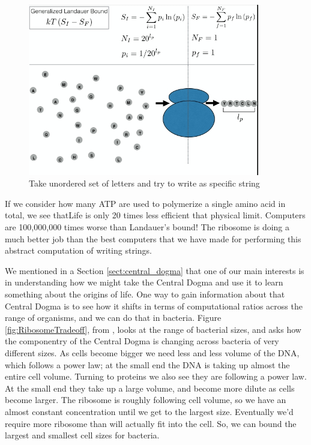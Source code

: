 \documentclass[]{article}
\begin{document}
\begin{figure}[H]
	\caption[Illustrating Landuer's Bound]{Take unordered set of letters and try to write as specific string\cite{kempes2017thermodynamic}}\label{fig:LandauerRibosome} 
	\includegraphics[width=0.9\textwidth]{LandauerRibosome}
\end{figure}

If we consider how many ATP are used to polymerize a single amino acid in total, we see thatLife is only 20 times less efficient that physical limit\cite{kempes2017thermodynamic}. Computers are 100,000,000 times worse than Landauer's bound! The ribosome is doing a much better job than the best computers that we have made for performing this abstract computation of writing strings.


We mentioned in a Section \ref{sect:central_dogma} that one of our main interests is in understanding how we might take the Central Dogma and use it to learn something about the origins of life. One way to gain information about that Central Dogma is to see how it shifts in terms of computational ratios across the range of organisms, and we can do that in bacteria. Figure \ref{fig:RibosomeTradeoff}, from \cite{kempes2016evolutionary}, looks at the range of bacterial sizes, and asks how the componentry of the Central Dogma is changing across bacteria of very different sizes. As cells become bigger we need less and less volume of the DNA, which follows a power law; at the small end the DNA is taking up almost the entire cell volume. Turning to proteins we also see they are following a power law. At the small end they take up a large volume, and become more dilute as cells become larger. The ribosome is roughly following cell volume, so we have an almost constant concentration until we get to the largest size. Eventually we'd require more ribosome than will actually fit into the cell. So, we can bound the largest and smallest cell sizes for bacteria.
\end{document}
